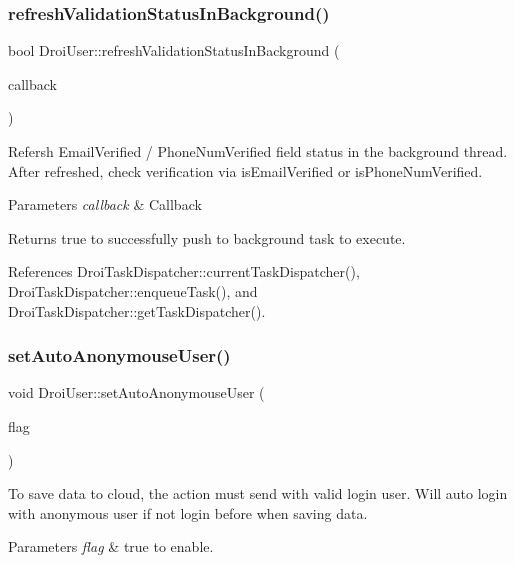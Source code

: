 \subsubsection{\texorpdfstring{refresh\+Validation\+Status\+In\+Background()}{refreshValidationStatusInBackground()}}
{\footnotesize\ttfamily bool Droi\+User\+::refresh\+Validation\+Status\+In\+Background (\begin{DoxyParamCaption}\item[{\hyperlink{struct_droi_callback}{Droi\+Callback}$<$ Ref\+Ptr$<$ \hyperlink{class_droi_user}{Droi\+User} $>$$>$\+::on\+Callback2}]{callback }\end{DoxyParamCaption})}

Refersh Email\+Verified / Phone\+Num\+Verified field status in the background thread. After refreshed, check verification via is\+Email\+Verified or is\+Phone\+Num\+Verified.


\begin{DoxyParams}{Parameters}
{\em callback} & Callback \\
\hline
\end{DoxyParams}
\begin{DoxyReturn}{Returns}
true to successfully push to background task to execute. 
\end{DoxyReturn}


References Droi\+Task\+Dispatcher\+::current\+Task\+Dispatcher(), Droi\+Task\+Dispatcher\+::enqueue\+Task(), and Droi\+Task\+Dispatcher\+::get\+Task\+Dispatcher().

\mbox{\label{class_droi_user_acf4f563aca5705d83ede8fcaf2277c39}} 
\subsubsection{\texorpdfstring{set\+Auto\+Anonymouse\+User()}{setAutoAnonymouseUser()}}
{\footnotesize\ttfamily void Droi\+User\+::set\+Auto\+Anonymouse\+User (\begin{DoxyParamCaption}\item[{bool}]{flag }\end{DoxyParamCaption})\hspace{0.3cm}{\ttfamily [static]}}

To save data to cloud, the action must send with valid login user. Will auto login with anonymous user if not login before when saving data. 
\begin{DoxyParams}{Parameters}
{\em flag} & true to enable. \\
\hline
\end{DoxyParams}
\mbox{\label{class_droi_user_a20e7019a45e75a54fb117feacb000f33}} 
